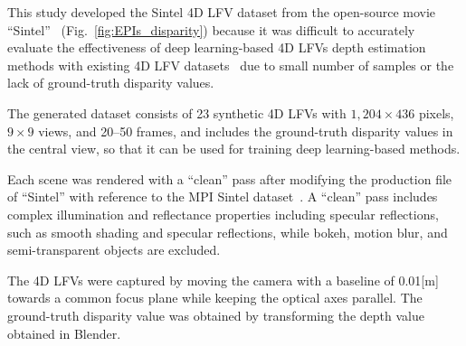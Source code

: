 \documentclass[]{spie}
\newcommand{\jtextd}[1]{}
\begin{document}
This study developed the Sintel 4D LFV dataset from the open-source movie ``Sintel''~\cite{sintel2010}
(Fig.~\ref{fig:EPIs_disparity})
because it was difficult to accurately evaluate the effectiveness of 
deep learning-based 4D LFVs depth estimation methods 
with existing 4D LFV datasets~\cite{wang2017light,brizzi2019feature}
due to small number of samples or the lack of ground-truth disparity values.


The generated dataset consists of 23 synthetic 4D LFVs 
with $1,204 \times 436$ pixels, $9 \times 9$ views, and 20--50 frames, 
and includes the ground-truth disparity values in the central view, 
so that it can be used for training deep learning-based methods.


\jtextd{
  それぞれのシーンは，MPI Sintelデータセット~\cite{butler2012naturalistic}
を参考に
  ``Sintel''のプロダクションファイルを修正し，``clean''パスでレンダリングを行った．
  ``clean''パスは，滑らかな陰影や鏡面反射など，複雑な照明と反射特性が含まれている一方で，
  ボケやモーションブラー，半透明オブジェクトは除外されている．
}

Each scene was rendered with a ``clean'' pass 
after modifying the production file of ``Sintel'' 
with reference to the MPI Sintel dataset~\cite{butler2012naturalistic}.
A ``clean'' pass includes
complex illumination and reflectance properties including specular reflections,
such as smooth shading and specular reflections,
while bokeh, motion blur, and semi-transparent objects are excluded.
\jtextd{
  4D LFVsの撮影は，光軸を平行に保ちながらカメラを共通の焦点面に
  向かって移動させて行った．
視差マップは，Blender
で得られる奥行きマップを
  次の式を用いて変換することで取得した．
  \begin{equation}
    disparity = \frac{B \times f}{z}
  \end{equation}
  ここで，$B$はベースライン，$f$は焦点距離，$z$は奥行きである．
  この変換により得られた視差マップは，ほとんどのシーンでは[0, 1]の範囲内にあるが，
  いくつかのシーンでは1.5まである．
}
The 4D LFVs were captured by moving the camera
with a baseline of 0.01[m]
towards a common focus plane while keeping the optical axes parallel.
The ground-truth disparity value was obtained by transforming 
the depth value obtained in Blender.
\end{document}
